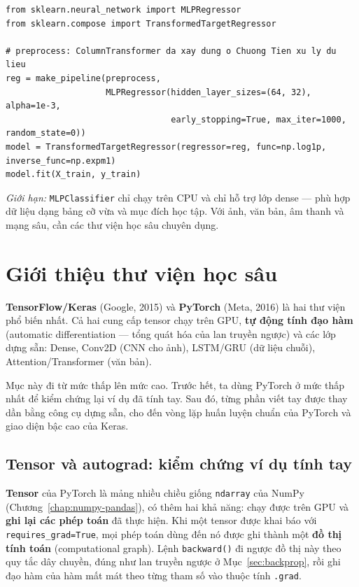 \begin{lstlisting}[caption={MLPRegressor dự đoán giá nhà Ames}]
from sklearn.neural_network import MLPRegressor
from sklearn.compose import TransformedTargetRegressor

# preprocess: ColumnTransformer da xay dung o Chuong Tien xu ly du lieu
reg = make_pipeline(preprocess,
                    MLPRegressor(hidden_layer_sizes=(64, 32), alpha=1e-3,
                                 early_stopping=True, max_iter=1000, random_state=0))
model = TransformedTargetRegressor(regressor=reg, func=np.log1p, inverse_func=np.expm1)
model.fit(X_train, y_train)
\end{lstlisting}

\noindent\textit{Giới hạn:} \texttt{MLPClassifier} chỉ chạy trên CPU và chỉ hỗ trợ lớp dense --- phù hợp dữ liệu dạng bảng cỡ vừa và mục đích học tập. Với ảnh, văn bản, âm thanh và mạng sâu, cần các thư viện học sâu chuyên dụng.

\section{Giới thiệu thư viện học sâu}
\label{sec:dl-libs}

\textbf{TensorFlow/Keras} (Google, 2015) và \textbf{PyTorch} (Meta, 2016) là hai thư viện phổ biến nhất. Cả hai cung cấp tensor chạy trên GPU, \textbf{tự động tính đạo hàm} (automatic differentiation --- tổng quát hóa của lan truyền ngược) và các lớp dựng sẵn: Dense, Conv2D (CNN cho ảnh), LSTM/GRU (dữ liệu chuỗi), Attention/Transformer (văn bản).

Mục này đi từ mức thấp lên mức cao. Trước hết, ta dùng PyTorch ở mức thấp nhất để kiểm chứng lại ví dụ đã tính tay. Sau đó, từng phần viết tay được thay dần bằng công cụ dựng sẵn, cho đến vòng lặp huấn luyện chuẩn của PyTorch và giao diện bậc cao của Keras.

\subsection{Tensor và autograd: kiểm chứng ví dụ tính tay}
\label{sec:torch-autograd}

\textbf{Tensor} của PyTorch là mảng nhiều chiều giống \texttt{ndarray} của NumPy (Chương~\ref{chap:numpy-pandas}), có thêm hai khả năng: chạy được trên GPU và \textbf{ghi lại các phép toán} đã thực hiện. Khi một tensor được khai báo với \texttt{requires\_grad=True}, mọi phép toán dùng đến nó được ghi thành một \textbf{đồ thị tính toán} (computational graph). Lệnh \texttt{backward()} đi ngược đồ thị này theo quy tắc dây chuyền, đúng như lan truyền ngược ở Mục~\ref{sec:backprop}, rồi ghi đạo hàm của hàm mất mát theo từng tham số vào thuộc tính \texttt{.grad}.

